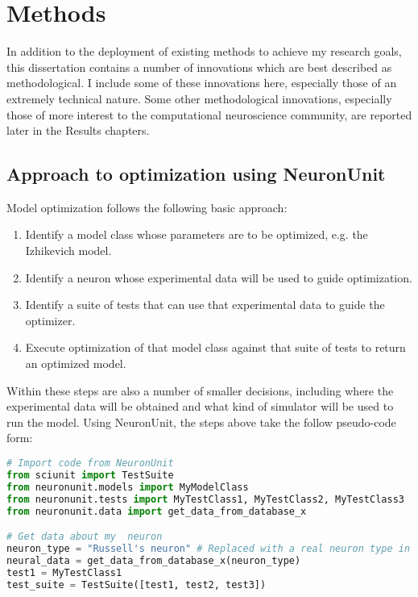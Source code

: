 \chapter{Methods}
In addition to the deployment of existing methods to achieve my research goals, this dissertation contains a number of innovations which are best described as methodological.  I include some of these innovations here, especially those of an extremely technical nature.  Some other methodological innovations, especially those of more interest to the computational neuroscience community, are reported later in the Results chapters.

\section{Approach to optimization using NeuronUnit}
Model optimization follows the following basic approach:
\begin{enumerate}
	\item Identify a model class whose parameters are to be optimized, e.g. the Izhikevich model.
	\item Identify a neuron whose experimental data will be used to guide optimization.
	\item Identify a suite of tests that can use that experimental data to guide the optimizer.
	\item Execute optimization of that model class against that suite of tests to return an optimized model.
\end{enumerate}
Within these steps are also a number of smaller decisions, including where the experimental data will be obtained and what kind of simulator will be used to run the model.
Using NeuronUnit, the steps above take the follow pseudo-code form:
\begin{lstlisting}[language=python]
# Import code from NeuronUnit
from sciunit import TestSuite
from neuronunit.models import MyModelClass
from neuronunit.tests import MyTestClass1, MyTestClass2, MyTestClass3
from neuronunit.data import get_data_from_database_x

# Get data about my  neuron
neuron_type = "Russell's neuron" # Replaced with a real neuron type in production
neural_data = get_data_from_database_x(neuron_type)
test1 = MyTestClass1
test_suite = TestSuite([test1, test2, test3])
\end{lstlisting}

%
%




